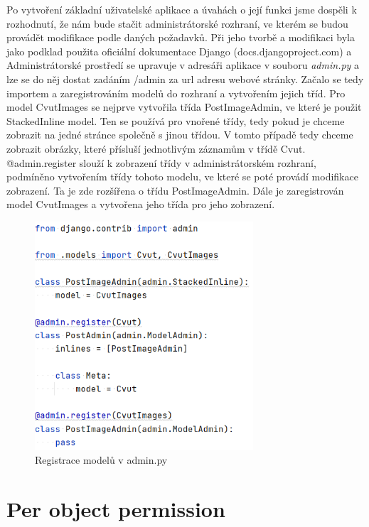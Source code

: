 Po vytvoření základní uživatelské aplikace a úvahách o její funkci jsme dospěli k rozhodnutí, že nám bude stačit administrátorské rozhraní, ve kterém se budou provádět modifikace podle daných požadavků.
Při jeho tvorbě a modifikaci byla jako podklad použita oficiální dokumentace Django (docs.djangoproject.com) a \cite{django-admin-book} Administrátorské prostředí se upravuje v adresáři aplikace v souboru \emph{admin.py} a lze se do něj dostat zadáním /admin za url adresu webové stránky. Začalo se tedy importem a zaregistrováním modelů do rozhraní a vytvořením jejich tříd. Pro model CvutImages se nejprve vytvořila třída PostImageAdmin, ve které je použit StackedInline model. Ten se používá pro vnořené třídy, tedy pokud je chceme zobrazit na jedné stránce společně s jinou třídou. V tomto případě tedy chceme zobrazit obrázky, které přísluší jednotlivým záznamům v třídě Cvut. @admin.register slouží k zobrazení třídy v administrátorském rozhraní, podmíněno vytvořením třídy tohoto modelu, ve které se poté provádí modifikace zobrazení. Ta je zde rozšířena o třídu PostImageAdmin. Dále je zaregistrován model CvutImages a vytvořena jeho třída pro jeho zobrazení.

\begin{figure}[H] \centering
    \includegraphics[width=230pt]{./pictures/12-admin-reg.PNG}
    \caption[Registrace modelů v admin.py]{Registrace modelů v admin.py}
	\label{fig:Registrace modelů v admin.py}              
\end{figure}

\newpage


\section{Per object permission}

